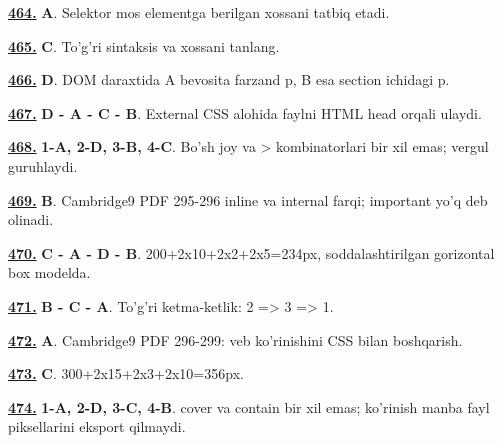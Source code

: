 \documentclass[10pt,a4paper,oneside]{article}
\begin{document}
\noindent\hyperlink{q464}{\textbf{464.}} \textbf{A}.  Selektor mos elementga berilgan xossani tatbiq etadi.
\par\vspace{3mm}
\noindent\hyperlink{q465}{\textbf{465.}} \textbf{C}.  To'g'ri sintaksis va xossani tanlang.
\par\vspace{3mm}
\noindent\hyperlink{q466}{\textbf{466.}} \textbf{D}.  DOM daraxtida A bevosita farzand p, B esa section ichidagi p.
\par\vspace{3mm}
\noindent\hyperlink{q467}{\textbf{467.}} \textbf{D - A - C - B}.  External CSS alohida faylni HTML head orqali ulaydi.
\par\vspace{3mm}
\noindent\hyperlink{q468}{\textbf{468.}} \textbf{1-A, 2-D, 3-B, 4-C}.  Bo'sh joy va \textgreater{} kombinatorlari bir xil emas; vergul guruhlaydi.
\par\vspace{3mm}
\noindent\hyperlink{q469}{\textbf{469.}} \textbf{B}.  Cambridge9 PDF 295-296 inline va internal farqi; important yo'q deb olinadi.
\par\vspace{3mm}
\noindent\hyperlink{q470}{\textbf{470.}} \textbf{C - A - D - B}.  200+2x10+2x2+2x5=234px, soddalashtirilgan gorizontal box modelda.
\par\vspace{3mm}
\noindent\hyperlink{q471}{\textbf{471.}} \textbf{B - C - A}.  To'g'ri ketma-ketlik: 2 =\textgreater{} 3 =\textgreater{} 1.
\par\vspace{3mm}
\noindent\hyperlink{q472}{\textbf{472.}} \textbf{A}.  Cambridge9 PDF 296-299: veb ko'rinishini CSS bilan boshqarish.
\par\vspace{3mm}
\noindent\hyperlink{q473}{\textbf{473.}} \textbf{C}.  300+2x15+2x3+2x10=356px.
\par\vspace{3mm}
\noindent\hyperlink{q474}{\textbf{474.}} \textbf{1-A, 2-D, 3-C, 4-B}.  cover va contain bir xil emas; ko'rinish manba fayl piksellarini eksport qilmaydi.
\par\vspace{3mm}
\end{document}

